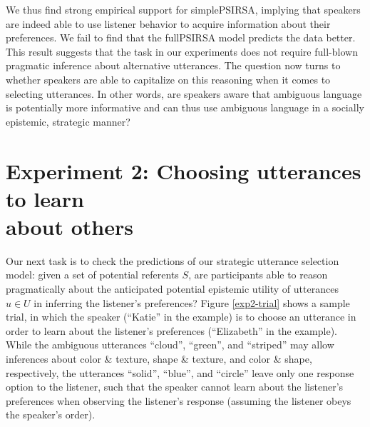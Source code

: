 \documentclass[11pt,a4paper]{article}
\begin{document}
We thus find strong empirical support for simplePSIRSA, implying that speakers are indeed able to use listener behavior to acquire information about their preferences. We fail to find that the fullPSIRSA model predicts the data better.
This result suggests that the task in our experiments does not require full-blown pragmatic inference about alternative utterances.
The question now turns to whether speakers are able to capitalize on this reasoning when it comes to selecting utterances. In other words, are speakers aware that ambiguous language is potentially more informative and can thus use ambiguous language in a socially epistemic, strategic manner?


\section{Experiment 2: Choosing utterances to learn \\ about others}

Our next task is to check the predictions of our strategic utterance selection model: given a set of potential referents $S$, are participants able to reason pragmatically about the anticipated potential epistemic utility of utterances $u\in U$ in inferring the listener's preferences? Figure \ref{exp2-trial} shows a sample trial, in which the speaker (``Katie'' in the example) is to choose an utterance in order to learn about the listener's preferences (``Elizabeth'' in the example). While the ambiguous utterances ``cloud'', ``green'', and ``striped'' may allow inferences about color \& texture, shape \& texture, and color \& shape, respectively, the utterances ``solid'', ``blue'', and ``circle'' leave only one response option to the listener, such that the speaker cannot learn about the listener's preferences when observing the listener's response (assuming the listener obeys the speaker's order).  
\end{document}
